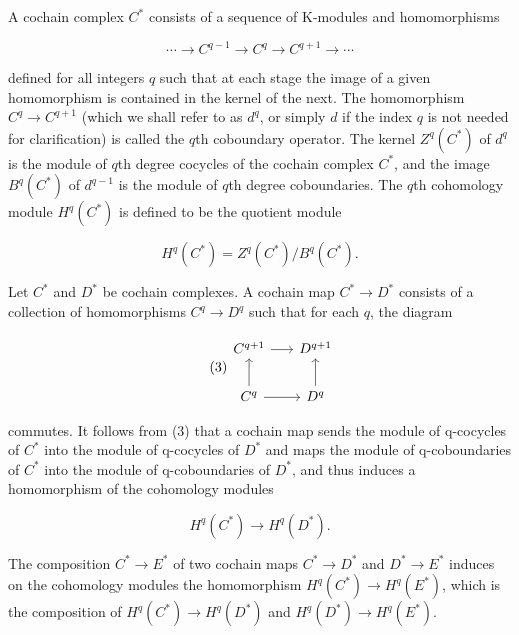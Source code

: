 \begin{definition}\label{thm:5.16}
A cochain complex  $ C^{*} $ consists of a sequence of K-modules and homomorphisms

\begin{equation}
\tag{1}\label{eq:5.16:1}
\cdots\to C^{q-1}\to C^{q}\to C^{q+1}\to\cdots
\end{equation}

defined for all integers $q$ such that at each stage the image of a given homomorphism is contained in the kernel of the next. The homomorphism $C^{q} \to C^{q+1}$ (which we shall refer to as $d^{q}$, or simply $d$ if the index $q$ is not needed for clarification) is called the $q$th coboundary operator. The kernel $Z^{q}(C^{*})$ of $d^{q}$ is the module of $q$th degree cocycles of the cochain complex $C^{*}$, and the image $B^{q}(C^{*})$ of $d^{q-1}$ is the module of $q$th degree coboundaries. The $q$th cohomology module $H^{q}(C^{*})$ is defined to be the quotient module

\begin{equation}
\tag{2}\label{eq:5.16:2}
H^{q}(C^{*})=Z^{q}(C^{*})/B^{q}(C^{*}).
\end{equation}

Let  $ C^* $ and  $ D^* $ be cochain complexes. A cochain map  $ C^* \to D^* $ consists of a collection of homomorphisms  $ C^q \to D^q $ such that for each  $ q $, the diagram 

\begin{equation}
\tag{3}\label{eq:5.16:3}
\begin{tikzcd}[ampersand replacement=\&, column sep=1.6em,row sep=2em]
C^{q+1} \arrow[r] \& D^{q+1} \\
C^q \arrow[r] \arrow[u] \& D^q \arrow[u]
\end{tikzcd}
\end{equation}

commutes. It follows from (3) that a cochain map sends the module of q-cocycles of  $ C^* $ into the module of q-cocycles of  $ D^* $ and maps the module of q-coboundaries of  $ C^* $ into the module of q-coboundaries of  $ D^* $, and thus induces a homomorphism of the cohomology modules

\begin{equation}
\tag{4}\label{eq:5.16:4}
H^{q}(C^{*})\to H^{q}(D^{*}).
\end{equation}

The composition $C^{*}\to E^{*}$ of two cochain maps $C^{*}\to D^{*}$ and $D^{*}\to E^{*}$ induces on the cohomology modules the homomorphism $H^{q}(C^{*})\to H^{q}(E^{*})$, which is the composition of $H^{q}(C^{*})\to H^{q}(D^{*})$ and $H^{q}(D^{*})\to H^{q}(E^{*})$.


\end{definition}
